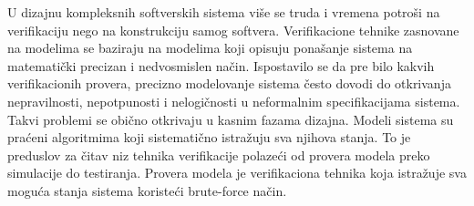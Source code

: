 \documentclass[a4paper]{article}
\begin{document}
{	U dizajnu kompleksnih softverskih sistema više se truda i vremena potroši na
	verifikaciju nego na konstrukciju samog softvera. Verifikacione tehnike  zasnovane na modelima se baziraju na modelima koji opisuju ponašanje sistema na matematički precizan i nedvosmislen način. Ispostavilo se da pre bilo kakvih verifikacionih provera, precizno modelovanje sistema često dovodi do otkrivanja nepravilnosti, nepotpunosti i nelogičnosti u neformalnim specifikacijama sistema. Takvi problemi se obično otkrivaju u kasnim fazama dizajna. Modeli sistema su praćeni algoritmima koji sistematično istražuju sva njihova stanja. To je preduslov za čitav niz tehnika verifikacije polazeći od provera modela preko simulacije do testiranja.
	Provera modela je verifikaciona tehnika koja istražuje sva moguća stanja sistema koristeći brute-force način.
	

}
\end{document}

